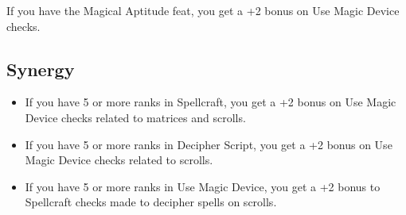 If you have the Magical Aptitude feat, you get a +2 bonus on Use Magic Device checks.
\subsection{Synergy}
\begin{itemize}
\item If you have 5 or more ranks in Spellcraft, you get a +2 bonus on Use Magic Device checks related to matrices and scrolls.
\item If you have 5 or more ranks in Decipher Script, you get a +2 bonus on Use Magic Device checks related to scrolls.
\item If you have 5 or more ranks in Use Magic Device, you get a +2 bonus to Spellcraft checks made to decipher spells on scrolls.
\end{itemize}
